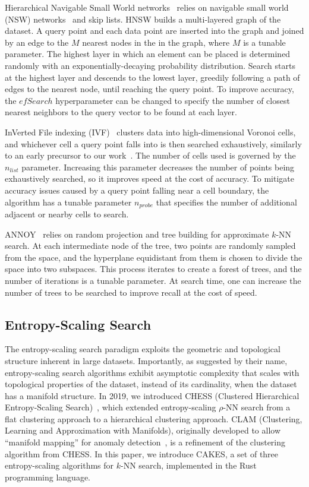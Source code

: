 Hierarchical Navigable Small World networks~\cite{malkov2016hnsw} relies on navigable small world (NSW) networks~\cite{kleinberg2000navigation, boguna2009navigability} and skip lists.
HNSW builds a multi-layered graph of the dataset.
A query point and each data point are inserted into the graph and joined by an edge to the $M$ nearest nodes in the in the graph, where $M$ is a tunable parameter.
The highest layer in which an element can be placed is determined randomly with an exponentially-decaying probability distribution.
Search starts at the highest layer and descends to the lowest layer, greedily following a path of edges to the nearest node, until reaching the query point.
To improve accuracy, the $efSearch$ hyperparameter can be changed to specify the number of closest nearest neighbors to the query vector to be found at each layer.

InVerted File indexing (IVF)~\cite{faissivf, sacks1987multikey, kent1990signature} clusters data into high-dimensional Voronoi cells, and whichever cell a query point falls into is then searched exhaustively, similarly to an early precursor to our work~\cite{yu2015entropy}.
The number of cells used is governed by the $n_{list}$ parameter.
Increasing this parameter decreases the number of points being exhaustively searched, so it improves speed at the cost of accuracy.
To mitigate accuracy issues caused by a query point falling near a cell boundary, the algorithm has a tunable parameter $n_{probe}$ that specifies the number of additional adjacent or nearby cells to search.

ANNOY~\cite{annoy} relies on random projection and tree building for approximate $k$-NN search.
At each intermediate node of the tree, two points are randomly sampled from the space, and the hyperplane equidistant from them is chosen to divide the space into two subspaces.
This process iterates to create a forest of trees, and the number of iterations is a tunable parameter.
At search time, one can increase the number of trees to be searched to improve recall at the cost of speed.


\subsection{Entropy-Scaling Search}
\label{sec:intoduction:entropy-scaling-search}

The entropy-scaling search paradigm exploits the geometric and topological structure inherent in large datasets.
Importantly, as suggested by their name, entropy-scaling search algorithms exhibit asymptotic complexity that scales with topological properties of the dataset, instead of its cardinality, when the dataset has a manifold structure.
In 2019, we introduced CHESS (Clustered Hierarchical Entropy-Scaling Search)~\cite{ishaq2019clustered}, which extended entropy-scaling $\rho$-NN search from a flat clustering approach to a hierarchical clustering approach.
CLAM (Clustering, Learning and Approximation with Manifolds), originally developed to allow ``manifold mapping'' for anomaly detection~\cite{ishaq2021clustered}, is a refinement of the clustering algorithm from CHESS.
In this paper, we introduce CAKES, a set of three entropy-scaling algorithms for $k$-NN search, implemented in the Rust programming language.


